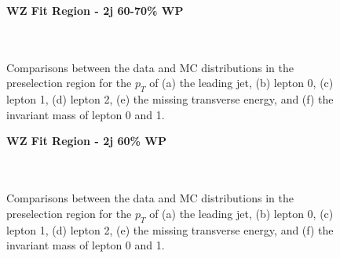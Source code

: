 \begin{figure}[h]
    \centering
    \textbf{WZ Fit Region - 2j 60-70\% WP}\\
    \\
    \\
    \caption{Comparisons between the data and MC distributions in the preselection region for the $p_T$ of (a) the leading jet, (b) lepton 0, (c) lepton 1, (d) lepton 2, (e) the missing transverse energy, and (f) the invariant mass of lepton 0 and 1.}
    \label{kin:WP_2j_60_70}
\end{figure}

\begin{figure}[h]
    \centering
    \textbf{WZ Fit Region - 2j 60\% WP}\\
    \\
    \\
    \caption{Comparisons between the data and MC distributions in the preselection region for the $p_T$ of (a) the leading jet, (b) lepton 0, (c) lepton 1, (d) lepton 2, (e) the missing transverse energy, and (f) the invariant mass of lepton 0 and 1.}
    \label{kin:WP_2j_60}
\end{figure}

